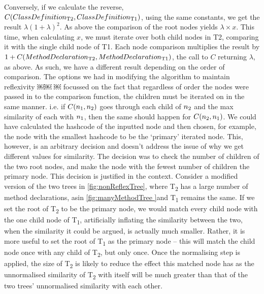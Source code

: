 Conversely, if we calculate the reverse, 
$C(ClassDefinition\textsubscript{T2}, ClassDefinition\textsubscript{T1})$, using the same constants, we get the result $\lambda(1+\lambda)^2$. As above the comparison of the root nodes yields $\lambda \times x$. This time, when calculating $x$, we must
iterate over both child nodes in T2, comparing it with the single child node of
T1. Each node comparison multiplies the result by $1+C(MethodDeclaration\textsubscript{T2},MethodDeclaration\textsubscript{T1})$, the call to $C$ returning $\lambda$, as above. As such, we have a different result depending on the order of comparison.
The options we had in modifying the algorithm to maintain reflexivity
￼￼
￼
focussed on the fact that regardless of order the nodes were passed in to the comparison function, the children must be iterated on in the same manner. 
i.e. if $C(n\textsubscript{1},n\textsubscript{2})$ goes through each child of $n\textsubscript{2}$ and the max similarity of each with $n\textsubscript{1}$, then the same should happen for
$C(n\textsubscript{2},n\textsubscript{1})$. We could have calculated the hashcode of the inputted node and then chosen, for example, the node with the smallest hashcode to be the `primary' iterated node. This, however, is an arbitrary decision and doesn’t address the issue of why we get different values for similarity. The decision was to check the number of children of the two root nodes, and make the node with the fewest number of children the primary node.
This decision is justified in the context. Consider a modified version of the two trees in 
\cref{fig:nonReflexTree}, where T\textsubscript{2} has a large number of method declarations, asin \cref{fig:manyMethodTree }and T\textsubscript{1} remains the same. If we set the
root of T\textsubscript{2} to be the primary node, we would match every child node with the one child node of T\textsubscript{1}, artificially inflating the similarity between the two, when the similarity it could be argued, is actually much smaller. Rather, it is more useful to set the root of T\textsubscript{1} as the primary node -- this will match the child node once with any child of T\textsubscript{2}, but only once. Once the normalising step is applied, the size of 
T\textsubscript{2} is likely to reduce the effect this matched node has as the unnormalised similarity of T\textsubscript{2} with itself will be much greater than that of the two trees’ unnormalised similarity with each other. 

